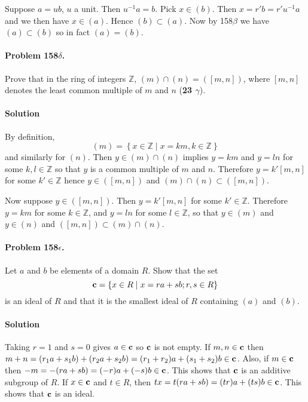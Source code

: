 Suppose $ a = ub$, $u$ a unit. Then $ u^{-1}a = b$. Pick $ x \in (b)$. Then $ x
= r'b = r' u^{-1} a$ and we then have $ x \in (a) $. Hence $ (b) \subset (a)$.
Now by 158$\beta$ we have $ (a) \subset (b) $ so in fact $ (a) = (b) $.

\paragraph{Problem 158$\delta$.}
Prove that in the ring of integers $\mathbb{Z}$, $(m) \cap (n) = ([m,n])$,
where $[m,n]$ denotes the least common multiple of $m$ and $n$ (\textbf{23
$\gamma$}).

\paragraph*{Solution}
By definition, $$ (m) = \left\{ x \in \mathbb{Z} \mid x = km, k \in \mathbb{Z}
\right\} $$ and similarly for $(n)$. Then $ y \in (m) \cap (n) $ implies $ y =
km $ and $y = ln $ for some $k, l \in \mathbb{Z}$ so that $y$ is a common
multiple of $m$ and $n$. Therefore $ y = k'[m,n]$ for some $k' \in \mathbb{Z}$
hence $ y \in ([m,n])$ and $(m) \cap (n) \subset ([m,n])$.

Now suppose $ y \in ([m,n])$. Then $ y = k'[m,n] $ for some $k' \in
\mathbb{Z}$.  Therefore $ y = km $ for some $k\in \mathbb{Z}$, and $ y = ln $
for some $l \in \mathbb{Z}$, so that $ y \in (m) $ and $ y \in (n)$ and
$([m,n]) \subset (m) \cap (n)$.

\paragraph{Problem 158$\epsilon$.}
Let $a$ and $b$ be elements of a domain $R$. Show that the set $$ \mathsf{\mathbf{c}} =
\left\{ x \in R \mid x = ra + sb; r, s \in R \right\} $$ is an ideal of $R$ and
that it is the smallest ideal of $R$ containing $(a)$ and $(b)$.

\paragraph*{Solution}
Taking $r = 1$ and $s = 0$ gives $a \in \mathsf{\mathbf{c}}$ so $\mathsf{\mathbf{c}}$ is not empty.
If $m, n \in \mathsf{\mathbf{c}}$ then $m + n = (r_1 a + s_1 b) + (r_2 a + s_2 b) = (r_1 +
r_2) a + (s_1 + s_2)b \in \mathsf{\mathbf{c}}$.  Also, if $ m \in \mathsf{\mathbf{c}} $ then $ -m =
-(ra + sb) = (-r)a + (-s)b \in \mathsf{\mathbf{c}}$. This shows that $\mathsf{\mathbf{c}}$ is an
additive subgroup of $R$. If $ x \in \mathsf{\mathbf{c}} $ and $ t \in R$, then $tx = t(ra
+ sb) = (tr)a + (ts)b \in \mathsf{\mathbf{c}}$. This shows that $\mathsf{\mathbf{c}}$ is an ideal.

